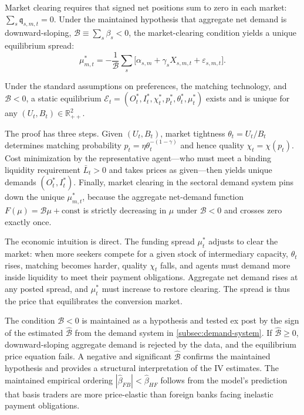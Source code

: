 Market clearing requires that signed net positions sum to zero in each market:
$\sum_s \mathfrak{q}_{s,m,t} = 0$. Under the maintained hypothesis that
aggregate net demand is downward-sloping, $\mathcal{B} \equiv \sum_s \beta_s <
0$, the market-clearing condition yields a unique equilibrium spread:
\begin{equation}
  \mu_{m,t}^{*} = -\frac{1}{\mathcal{B}} \sum_s \bigl[\alpha_{s,m} +
  \gamma_s X_{s,m,t} + \varepsilon_{s,m,t}\bigr].
  \label{eq:price-eq}
\end{equation}

\begin{theorem}
  \label{thm:equilibrium}
  Under the standard assumptions on preferences, the matching technology, and
  $\mathcal{B} < 0$, a static equilibrium $\mathcal{E}_t =
  (O_t^*, I_t^*, \chi_t^*, p_t^*, \theta_t^*, \mu_t^*)$ exists and is unique
  for any $(U_t, B_t) \in \mathbb{R}_{++}^2$.
\end{theorem}

The proof has three steps. Given $(U_t, B_t)$, market tightness $\theta_t =
U_t / B_t$ determines matching probability $p_t = \eta \theta_t^{-(1-\gamma)}$
and hence quality $\chi_t = \chi(p_t)$. Cost minimization by the representative
agent---who must meet a binding liquidity requirement $\bar{L}_t > 0$ and takes
prices as given---then yields unique demands $(O_t^*, I_t^*)$. Finally,
market clearing in the sectoral demand system pins down the unique $\mu_{m,t}^*$,
because the aggregate net-demand function $F(\mu) = \mathcal{B}\mu + \text{const}$
is strictly decreasing in $\mu$ under $\mathcal{B} < 0$ and crosses zero exactly
once.

The economic intuition is direct. The funding spread $\mu_t^*$ adjusts to clear
the market: when more seekers compete for a given stock of intermediary capacity,
$\theta_t$ rises, matching becomes harder, quality $\chi_t$ falls, and agents
must demand more inside liquidity to meet their payment obligations. Aggregate
net demand rises at any posted spread, and $\mu_t^*$ must increase to restore
clearing. The spread is thus the price that equilibrates the conversion market.

\begin{remark}
  \label{rem:maintained}
  \label{rem:beta-ordering}
  The condition $\mathcal{B} < 0$ is maintained as a hypothesis and tested ex
  post by the sign of the estimated $\hat{\mathcal{B}}$ from the demand system
  in \cref{subsec:demand-system}. If $\hat{\mathcal{B}} \geq 0$, downward-sloping
  aggregate demand is rejected by the data, and the equilibrium price equation
  fails. A negative and significant $\hat{\mathcal{B}}$ confirms the maintained
  hypothesis and provides a structural interpretation of the IV estimates.
  The maintained empirical ordering $|\hat\beta_{FB}| < \hat\beta_{HF}$ follows
  from the model's prediction that basis traders are more price-elastic than
  foreign banks facing inelastic payment obligations.
\end{remark}


